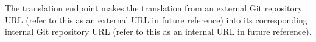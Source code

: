 \documentclass[../main.tex]{subfiles}
\begin{document}
The translation endpoint makes the translation from an external Git repository URL (refer to this as an external URL in future reference) into its corresponding internal Git repository URL (refer to this as an internal URL in future reference).
\end{document}
